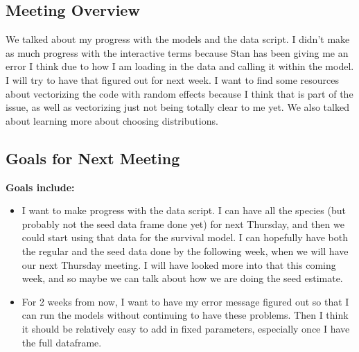 \documentclass{article}
\begin{document}
\subsection*{Meeting Overview}

We talked about my progress with the models and the data script. I didn't make as much progress with the interactive terms because Stan has been giving me an error I think due to how I am loading in the data and calling it within the model. I will try to have that figured out for next week. I want to find some resources about vectorizing the code with random effects because I think that is part of the issue, as well as vectorizing just not being totally clear to me yet. We also talked about learning more about choosing distributions. 

\subsection*{Goals for Next Meeting}
\textbf{Goals include:}
\begin{itemize}
\item{I want to make progress with the data script. I can have all the species (but probably not the seed data frame done yet) for next Thursday, and then we could start using that data for the survival model. I can hopefully have both the regular and the seed data done by the following week, when we will have our next Thursday meeting. I will have looked more into that this coming week, and so maybe we can talk about how we are doing the seed estimate.} 
\item{For 2 weeks from now, I want to have my error message figured out so that I can run the models without continuing to have these problems. Then I think it should be relatively easy to add in fixed parameters, especially once I have the full dataframe.}
\end{itemize}
\end{document}
